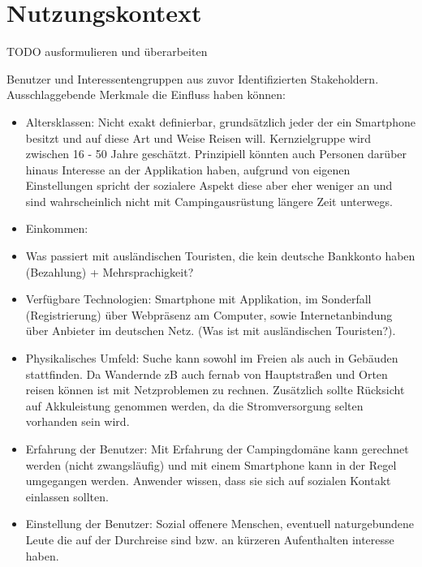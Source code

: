 
\section{Nutzungskontext}

TODO ausformulieren und überarbeiten

Benutzer und Interessentengruppen aus zuvor Identifizierten Stakeholdern. Ausschlaggebende Merkmale die Einfluss haben können:
\begin{itemize}
   \item Altersklassen: Nicht exakt definierbar, grundsätzlich jeder der ein Smartphone besitzt und auf diese Art und Weise Reisen will. Kernzielgruppe wird zwischen 16 - 50 Jahre geschätzt. Prinzipiell könnten auch Personen darüber hinaus Interesse an der Applikation haben, aufgrund von eigenen Einstellungen spricht der sozialere Aspekt diese aber eher weniger an und sind wahrscheinlich nicht mit Campingausrüstung längere Zeit unterwegs.

   \item Einkommen:

   \item Was passiert mit ausländischen Touristen, die kein deutsche Bankkonto haben (Bezahlung) + Mehrsprachigkeit?

   \item Verfügbare Technologien: Smartphone mit Applikation, im Sonderfall (Registrierung) über Webpräsenz am Computer, sowie Internetanbindung über Anbieter im deutschen Netz. (Was ist mit ausländischen Touristen?).  
   
   \item Physikalisches Umfeld: Suche kann sowohl im Freien als auch in Gebäuden stattfinden. Da Wandernde zB auch fernab von Hauptstraßen und Orten reisen können ist mit Netzproblemen zu rechnen. Zusätzlich sollte Rücksicht auf Akkuleistung genommen werden, da die Stromversorgung selten vorhanden sein wird.

    \item Erfahrung der Benutzer: Mit Erfahrung der Campingdomäne kann gerechnet werden (nicht zwangsläufig) und mit einem Smartphone kann in der Regel umgegangen werden. Anwender wissen, dass sie sich auf sozialen Kontakt einlassen sollten.

    \item Einstellung der Benutzer: Sozial offenere Menschen, eventuell naturgebundene Leute die auf der Durchreise sind bzw. an kürzeren Aufenthalten interesse haben.  


\end{itemize}

 
